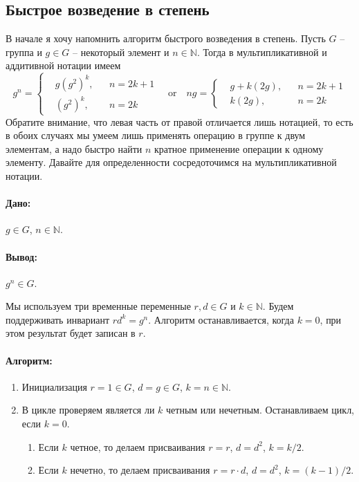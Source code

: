 \subsection{Быстрое возведение в степень}

В начале я хочу напомнить алгоритм быстрого возведения в степень. Пусть $G$ -- группа и $g\in G$ -- некоторый элемент и $n \in \mathbb N$. Тогда в мультипликативной и аддитивной нотации имеем
\[
g^n = 
\left\{
\begin{aligned}
&g (g^2)^{k}, & &n = 2k + 1\\
&(g^2)^k, & &n = 2k
\end{aligned}
\right.
\quad\text{or}\quad
ng = 
\left\{
\begin{aligned}
&g + k(2g), & &n = 2k + 1\\
&k (2g), & &n = 2k
\end{aligned}
\right.
\]
Обратите внимание, что левая часть от правой отличается лишь нотацией, то есть в обоих случаях мы умеем лишь применять операцию в группе к двум элементам, а надо быстро найти $n$ кратное применение операции к одному элементу. Давайте для определенности сосредоточимся на мультипликативной нотации.

\paragraph{Дано:}

$g\in G$, $n\in \mathbb N$.

\paragraph{Вывод:}

$g^n\in G$.

Мы используем три временные переменные $r, d\in G$ и $k\in \mathbb N$. Будем поддерживать инвариант  $r d^k = g^n$. Алгоритм останавливается, когда $k = 0$, при этом результат будет записан в $r$.

\paragraph{Алгоритм:}

\begin{enumerate}
\item Инициализация $r = 1\in G$, $d = g \in G$, $k = n\in \mathbb N$.

\item В цикле проверяем является ли $k$ четным или нечетным. Останавливаем цикл, если $k = 0$.
\begin{enumerate}
\item Если $k$ четное, то делаем присваивания $r = r$, $d = d^2$, $k = k / 2$.
\item Если $k$ нечетно, то делаем присваивания $r = r \cdot d$, $d = d^2$, $k = (k-1) / 2$.
\end{enumerate}
\end{enumerate}

